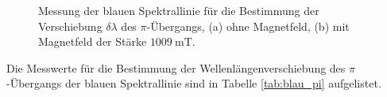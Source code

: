 \FloatBarrier
\begin{figure}
    \centering
    \vspace{0.1\textwidth}
    \caption{Messung der blauen Spektrallinie für die Bestimmung der Verschiebung $\delta \lambda$ des $\pi$-Übergangs, (a) ohne Magnetfeld, (b) mit Magnetfeld der Stärke $\SI{1009}{\milli\tesla}$.}
    \label{fig:blau_pi}
\end{figure}
\FloatBarrier
Die Messwerte für die Bestimmung der Wellenlängenverschiebung des $\pi$-Übergangs der blauen Spektrallinie sind in 
Tabelle \ref{tab:blau_pi} aufgelistet.
\FloatBarrier
